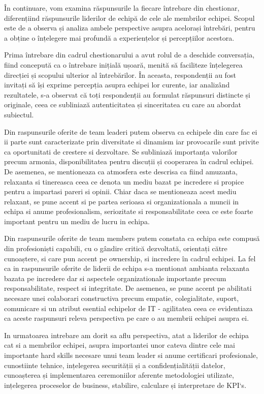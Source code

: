 \documentclass[a4paper, 12pt]{article}
\begin{document}
	\quad În continuare, vom examina răspunsurile la fiecare întrebare din chestionar, diferențiind răspunsurile liderilor de echipă de cele ale membrilor echipei. Scopul este de a observa și analiza ambele perspective asupra acelorași întrebări, pentru a obține o înțelegere mai profundă a experiențelor și percepțiilor acestora.

	\quad Prima întrebare din cadrul chestionarului a avut rolul de a deschide conversația, fiind concepută ca o întrebare inițială ușoară, menită să faciliteze înțelegerea direcției și scopului ulterior al întrebărilor. În aceasta, respondenții au fost invitați să își exprime percepția asupra echipei lor curente, iar  analizând rezultatele, s-a observat că toți respondenții au formulat răspunsuri distincte și originale, ceea ce subliniază autenticitatea și sinceritatea cu care au abordat subiectul.

	\quad Din raspunsurile oferite de team leaderi putem observa ca echipele din care fac ei ii parte sunt caracterizate prin diversitate si dinamism iar provocarile sunt privite ca oportunitati de crestere si dezvoltare. Se subliniază importanța valorilor precum armonia, disponibilitatea pentru discuții și cooperarea în cadrul echipei. De asemenea, se mentioneaza ca atmosfera este descrisa ca fiind amuzanta, relaxanta si tinereasca ceea ce denota un mediu bazat pe incredere si propice pentru a impartasi pareri si opinii. Chiar daca se mentioneaza acest mediu relaxant, se pune accent si pe partea serioasa si organizationala a muncii in echipa si anume profesionalism, seriozitate si responsabilitate ceea ce este foarte important pentru un mediu de lucru in echipa.

	\quad 	Din raspunsurile oferite de team members putem constata ca echipa este compusă din profesioniști capabili, cu o gândire critică dezvoltată, orientați către cunoaștere, si care pun accent pe ownership, si incredere în cadrul echipei. La fel ca in raspunsurile oferite de liderii de echipa s-a mentionat ambianta relaxanta bazata pe incredere dar si aspectele organizationale importante precum responsabilitate, respect si integritate. De asemenea, se pune accent pe abilitati necesare unei colaborari constructiva precum empatie, colegialitate, suport,  comunicare si un atribut esential echipelor de IT - agilitatea ceea ce evidentiaza ca aceste raspunsuri releva perspectiva pe care o au membrii echipei asupra ei.


	\quad In urmatoarea intrebare am dorit sa aflu perspectiva, atat a liderilor de echipa cat si a membrilor echipei, asupra importantei unor cateva dintre cele mai importante hard skills necesare unui team leader si anume certificari profesionale, cunostiinte tehnice, ințelegerea securității și a confidențialității datelor,  cunoașterea și implementarea ceremoniilor aferente metodologiei utilizate, ințelegerea proceselor de business, stabilire, calculare și interpretare de KPI`s. 
\end{document}
